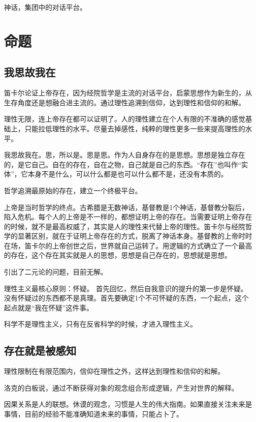 \documentclass[UTF8]{../RepresentationUniverse}
\begin{document}
神话，集团中的对话平台。

\section{命题}

\subsection{我思故我在}

笛卡尔论证上帝存在，因为经院哲学是主流的对话平台，启蒙思想作为新生的，从生存角度还是想融合进主流的。通过理性追溯到信仰，达到理性和信仰的和解。

理性无限，连上帝存在都可以证明了。人的理性建立在个人有限的不准确的感觉基础上，只能拉低理性的水平。尽量去掉感性，纯粹的理性更多一些来提高理性的水平。

我思故我在。思，所以是。思是思。作为人自身存在的是思想。思想是独立存在的，是它自己。自在的存在，自在之物，自己就是自己的东西。“存在”也叫作“实体”，它本身不是什么，可以什么都是也可以什么都不是，还没有本质的。

哲学追溯最原始的存在，建立一个终极平台。

上帝是当时哲学的终点。古希腊是无数神话，基督教是1个神话，基督教分裂后，陷入危机。每个人的上帝是不一样的，都想证明上帝的存在。当需要证明上帝存在的时候，就不是最高权威了，其实是人的理性来代替上帝的理性。笛卡尔与经院哲学的显著区别，就在于证明上帝存在的方式，脱离了神话本身。基督教的上帝时时在场，笛卡尔的上帝创世之后，世界就自己运转了。用逻辑的方式确立了一个最高的存在，这个存在其实就是人的思想，思想是自己存在的，思想就是思想。

引出了二元论的问题，目前无解。

理性主义最核心原则：怀疑。
首先回忆，然后自我意识的提升的第一步是怀疑。没有怀疑过的东西都不是真理。首先要确定1个不可怀疑的东西，一个起点，这个起点就是“我在怀疑”这件事。

科学不是理性主义，只有在反省科学的时候，才进入理性主义。

\subsection{存在就是被感知}

理性限制在有限范围内，信仰在理性之外，这样达到理性和信仰的和解。

洛克的白板说，通过不断获得对象的观念组合形成逻辑，产生对世界的解释。

因果关系是人的联想。休谟的观念，习惯是人生的伟大指南。如果直接关注未来是事情，目前的经验不能准确知道未来的事情，只能占卜了。
\end{document}
